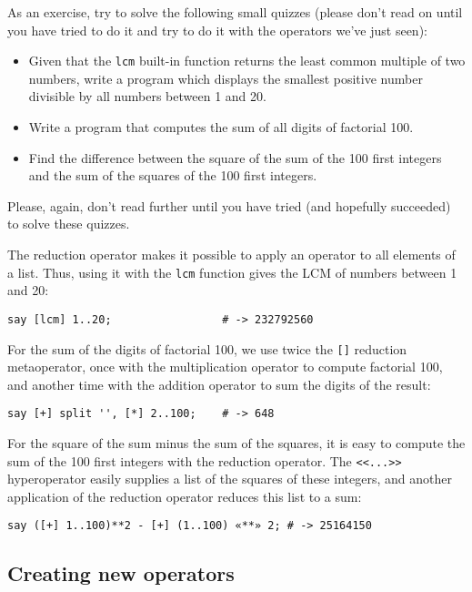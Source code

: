 As an exercise, try to solve the following small 
quizzes (please don't read on until you have tried 
to do it and try to do it with the operators we've 
just seen):

\begin{itemize}
\item Given that the {\tt lcm} built-in function 
returns the least common multiple of two numbers, 
write a program which displays the smallest positive 
number divisible by all numbers between 1 and 20.

\item Write a program that computes the sum of all 
digits of factorial 100.

\item Find the difference between the square of the sum 
of the 100 first integers and the sum of the squares of 
the 100 first integers.
\end{itemize}

Please, again, don't read further until you have tried 
(and hopefully succeeded) to solve these quizzes.

The reduction operator makes it possible to apply an 
operator to all elements of a list. Thus, using it 
with the {\tt lcm} function gives the LCM of numbers 
between 1 and 20:

\begin{verbatim}
say [lcm] 1..20;                 # -> 232792560
\end{verbatim}

For the sum of the digits of factorial 100, we use 
twice the \verb'[]' reduction metaoperator, once with 
the multiplication operator to compute factorial 100, 
and another time with the addition operator to sum 
the digits of the result:

\begin{verbatim}
say [+] split '', [*] 2..100;    # -> 648
\end{verbatim}

For the square of the sum minus the sum of the squares, 
it is easy to compute the sum of the 100 first integers 
with the reduction operator. The \verb'<<...>>' 
hyperoperator easily supplies a list of the squares of 
these integers, and another application of the reduction 
operator reduces this list to a sum:

\begin{verbatim}
say ([+] 1..100)**2 - [+] (1..100) «**» 2; # -> 25164150
\end{verbatim}

\subsection{Creating new operators}

